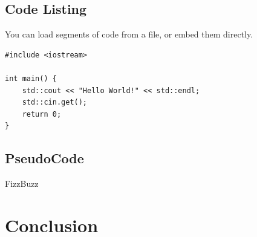 \documentclass[10pt, a4paper]{article}
\begin{document}
	\subsection{Code Listing}
    You can load segments of code from a file, or embed them directly.
    
\begin{lstlisting}[caption = Hello World! in c++]
#include <iostream>

int main() {
    std::cout << "Hello World!" << std::endl;
    std::cin.get();
    return 0;
}
\end{lstlisting}


    
\subsection{PseudoCode}

\begin{algorithm}[h]
\caption{FizzBuzz}
\end{algorithm}
	
\section{Conclusion}	


		
\end{document}
